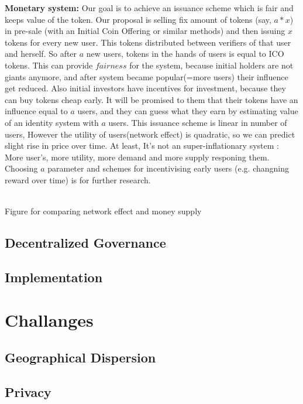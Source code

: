 \documentclass{article}
\begin{document}
\textbf{Monetary system:} Our goal is to achieve an issuance scheme which is fair and keeps value of the token. Our proposal is selling fix amount of tokens (say, $a*x$) in pre-sale (with an Initial Coin Offering  or similar methods) and then issuing $x$ tokens for every new user. This tokens distributed between verifiers of that user and herself. So after $a$ new users, tokens in the hands of users is equal to ICO tokens. This can provide $fairness$ for the system, because initial holders are not giants anymore, and after system became popular(=more users) their influence get reduced. Also initial investors have incentives for investment, because they can buy tokens cheap early. It will be promised to them that their tokens have an influence equal to $a$ users, and they can guess what they earn by estimating value of an identity system with $a$ users. This issuance scheme is linear in number of users, However the utility of users(network effect) is quadratic, so we can predict slight rise in price over time. At least, It's not an super-inflationary system : More user's, more utility, more demand and more supply responing them. Choosing $a$ parameter and schemes for incentivising early users (e.g. changning reward over time) is for further research.


\\ Figure for comparing network effect and money supply\\

\subsection{Decentralized Governance}


\subsection{Implementation}


\section{Challanges }



\subsection{Geographical Dispersion}

\subsection{Privacy}
\end{document}
